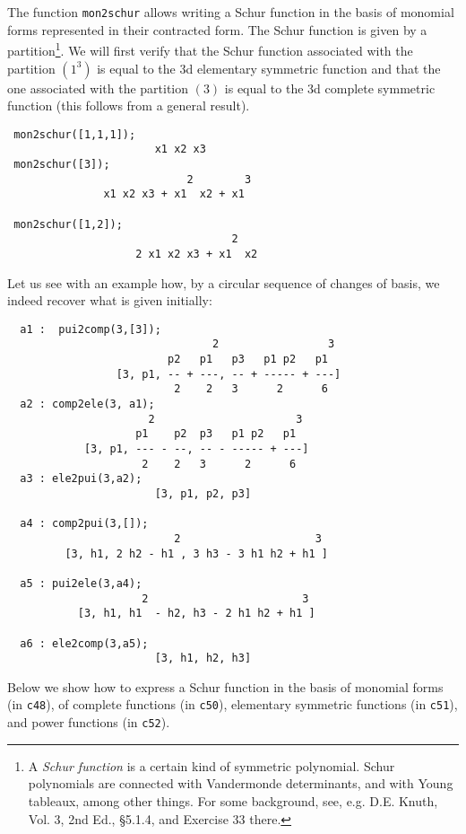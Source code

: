 \documentclass[11pt]{article}
\begin{document}
The function \texttt{mon2schur} allows writing a Schur function in the basis of
monomial forms represented in their contracted form.  The Schur function is
given by a partition\footnote{A \emph{Schur function} is a certain kind of
  symmetric polynomial.  Schur polynomials are connected with Vandermonde
  determinants, and with Young tableaux, among other things. For some
  background, see, e.g. D.E. Knuth, Vol. 3, 2nd Ed., \S5.1.4, and Exercise 33
  there.}.
We will first verify that the Schur function associated with the partition
$(1^3)$ is equal to the 3d elementary symmetric function and that the one
associated with the partition $(3)$ is equal to the 3d complete symmetric
function (this follows from a general result).
\small
\begin{verbatim}
 mon2schur([1,1,1]);
                       x1 x2 x3
 mon2schur([3]);
                            2        3
               x1 x2 x3 + x1  x2 + x1

 mon2schur([1,2]);
                                   2
                    2 x1 x2 x3 + x1  x2
\end{verbatim}
\normalsize
Let us see with an example how, by a circular sequence of changes of basis, we
indeed recover what is given initially:
\small
\begin{verbatim}
  a1 :  pui2comp(3,[3]);
                                2                 3
                         p2   p1   p3   p1 p2   p1
                 [3, p1, -- + ---, -- + ----- + ---]
                          2    2   3      2      6
  a2 : comp2ele(3, a1);
                      2                      3
                    p1    p2  p3   p1 p2   p1
            [3, p1, --- - --, -- - ----- + ---]
                     2    2   3      2      6
  a3 : ele2pui(3,a2);
                       [3, p1, p2, p3]

  a4 : comp2pui(3,[]);
                          2                     3
         [3, h1, 2 h2 - h1 , 3 h3 - 3 h1 h2 + h1 ]

  a5 : pui2ele(3,a4);
                     2                        3
           [3, h1, h1  - h2, h3 - 2 h1 h2 + h1 ]

  a6 : ele2comp(3,a5);
                       [3, h1, h2, h3]
\end{verbatim}
\normalsize
Below we show how to express a Schur function in the basis of monomial forms (in
\texttt{c48}), of complete functions (in \texttt{c50}), elementary symmetric
functions (in \texttt{c51}), and power functions (in \texttt{c52}).
\small
\end{document}
